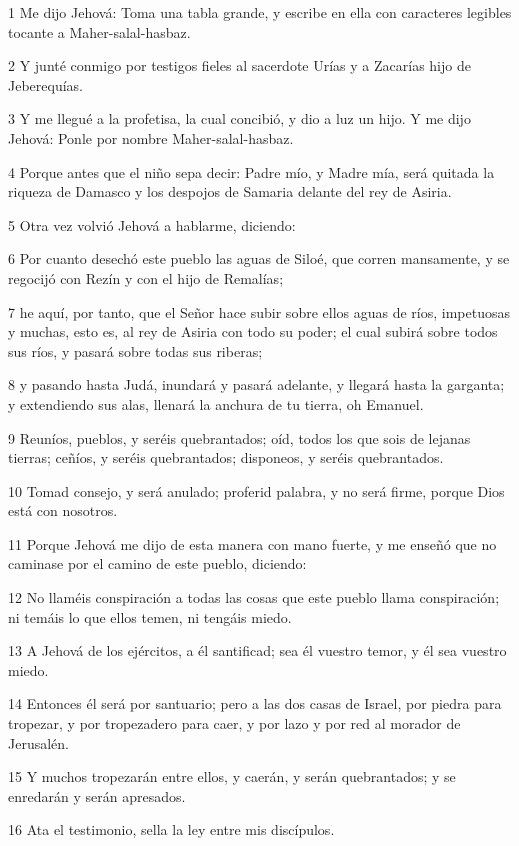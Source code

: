 \par 1 Me dijo Jehová: Toma una tabla grande, y escribe en ella con caracteres legibles tocante a Maher-salal-hasbaz.
\par 2 Y junté conmigo por testigos fieles al sacerdote Urías y a Zacarías hijo de Jeberequías.
\par 3 Y me llegué a la profetisa, la cual concibió, y dio a luz un hijo. Y me dijo Jehová: Ponle por nombre Maher-salal-hasbaz.
\par 4 Porque antes que el niño sepa decir: Padre mío, y Madre mía, será quitada la riqueza de Damasco y los despojos de Samaria delante del rey de Asiria.
\par 5 Otra vez volvió Jehová a hablarme, diciendo:
\par 6 Por cuanto desechó este pueblo las aguas de Siloé, que corren mansamente, y se regocijó con Rezín y con el hijo de Remalías;
\par 7 he aquí, por tanto, que el Señor hace subir sobre ellos aguas de ríos, impetuosas y muchas, esto es, al rey de Asiria con todo su poder; el cual subirá sobre todos sus ríos, y pasará sobre todas sus riberas;
\par 8 y pasando hasta Judá, inundará y pasará adelante, y llegará hasta la garganta; y extendiendo sus alas, llenará la anchura de tu tierra, oh Emanuel.
\par 9 Reuníos, pueblos, y seréis quebrantados; oíd, todos los que sois de lejanas tierras; ceñíos, y seréis quebrantados; disponeos, y seréis quebrantados.
\par 10 Tomad consejo, y será anulado; proferid palabra, y no será firme, porque Dios está con nosotros.
\par 11 Porque Jehová me dijo de esta manera con mano fuerte, y me enseñó que no caminase por el camino de este pueblo, diciendo:
\par 12 No llaméis conspiración a todas las cosas que este pueblo llama conspiración; ni temáis lo que ellos temen, ni tengáis miedo.
\par 13 A Jehová de los ejércitos, a él santificad; sea él vuestro temor, y él sea vuestro miedo.
\par 14 Entonces él será por santuario; pero a las dos casas de Israel, por piedra para tropezar, y por tropezadero para caer, y por lazo y por red al morador de Jerusalén.
\par 15 Y muchos tropezarán entre ellos, y caerán, y serán quebrantados; y se enredarán y serán apresados.
\par 16 Ata el testimonio, sella la ley entre mis discípulos.
